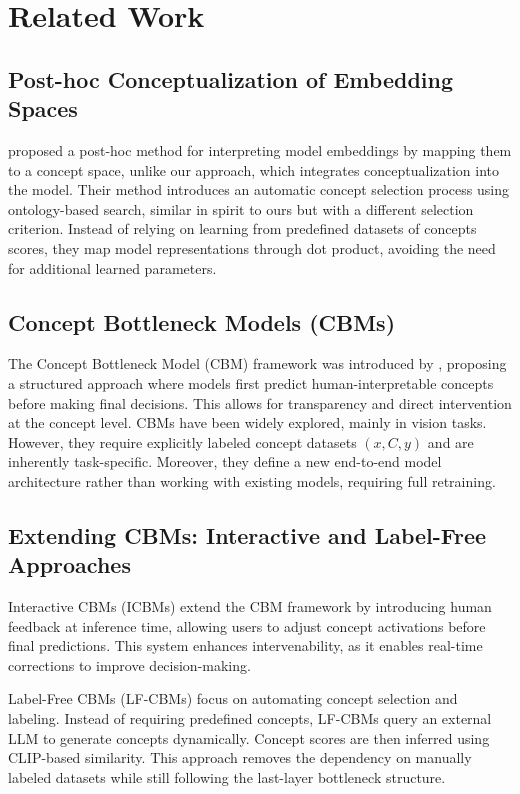 \section{Related Work}
\subsection{Post-hoc Conceptualization of Embedding Spaces}

\citet{simhi2023interpretingembeddingspacesconceptualization} proposed a post-hoc method for interpreting model embeddings by mapping them to a concept space, unlike our approach, which integrates conceptualization into the model. Their method introduces an automatic concept selection process using ontology-based search, similar in spirit to ours but with a different selection criterion. Instead of relying on learning from predefined datasets of concepts scores, they map model representations through dot product, avoiding the need for additional learned parameters.

\subsection{Concept Bottleneck Models (CBMs)}

The Concept Bottleneck Model (CBM) framework was introduced by \citet{koh2020conceptbottleneckmodels}, proposing a structured approach where models first predict human-interpretable concepts before making final decisions. This allows for transparency and direct intervention at the concept level. CBMs have been widely explored, mainly in vision tasks. However, they require explicitly labeled concept datasets $(x, C, y)$ and are inherently task-specific. Moreover, they define a new end-to-end model architecture rather than working with existing models, requiring full retraining.

\subsection{Extending CBMs: Interactive and Label-Free Approaches}

Interactive CBMs (ICBMs) \citep{chauhan2023interactiveconceptbottleneckmodels} extend the CBM framework by introducing human feedback at inference time, allowing users to adjust concept activations before final predictions. This system enhances intervenability, as it enables real-time corrections to improve decision-making.

Label-Free CBMs (LF-CBMs) \citep{oikarinen2023labelfreeconceptbottleneckmodels} focus on automating concept selection and labeling. Instead of requiring predefined concepts, LF-CBMs query an external LLM to generate concepts dynamically. Concept scores are then inferred using CLIP-based similarity. This approach removes the dependency on manually labeled datasets while still following the last-layer bottleneck structure.

